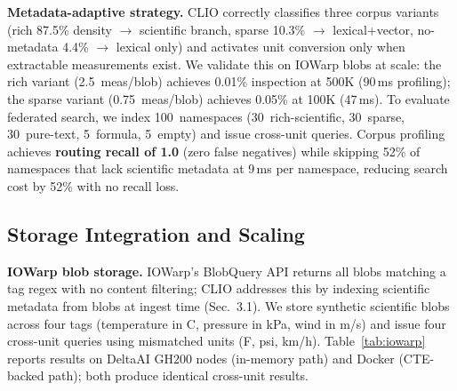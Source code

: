 \textbf{Metadata-adaptive strategy.} CLIO correctly classifies three
corpus variants (rich 87.5\% density $\to$ scientific branch, sparse
10.3\% $\to$ lexical+vector, no-metadata 4.4\% $\to$ lexical only)
and activates unit conversion only when extractable measurements exist.
We validate this on IOWarp blobs at scale: the rich variant
(2.5~meas/blob) achieves 0.01\% inspection at 500K (90\,ms profiling);
the sparse variant (0.75~meas/blob) achieves 0.05\% at 100K (47\,ms).
To evaluate federated search, we index 100~namespaces (30~rich-scientific, 30~sparse, 30~pure-text, 5~formula, 5~empty) and issue cross-unit queries. Corpus profiling achieves \textbf{routing recall of 1.0} (zero false negatives) while skipping 52\% of namespaces that lack scientific metadata at 9\,ms per namespace, reducing search cost by 52\% with no recall loss.

\subsection{Storage Integration and Scaling}
\label{sec:storage-scaling}

\textbf{IOWarp blob storage.}
IOWarp's BlobQuery API returns all blobs matching a tag regex with
no content filtering; CLIO addresses this by indexing scientific
metadata from blobs at ingest time (Sec.~3.1). We store synthetic
scientific blobs across four tags
(temperature in \textdegree C, pressure in kPa, wind in m/s) and
issue four cross-unit queries using mismatched units
(\textdegree F, psi, km/h). Table~\ref{tab:iowarp} reports results
on DeltaAI GH200 nodes (in-memory path) and Docker (CTE-backed path);
both produce identical cross-unit results.

